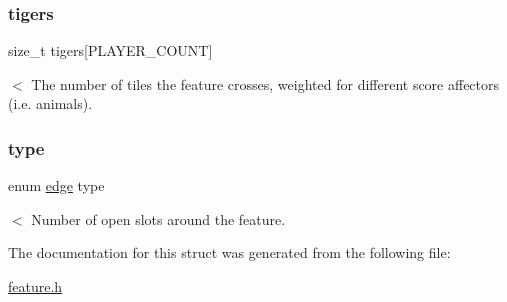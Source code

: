 \subsubsection{\texorpdfstring{tigers}{tigers}}
{\footnotesize\ttfamily size\+\_\+t tigers\mbox{[}P\+L\+A\+Y\+E\+R\+\_\+\+C\+O\+U\+NT\mbox{]}}

$<$ The number of tiles the feature crosses, weighted for different score affectors (i.\+e. animals). \hypertarget{structfeature_a4d7c1f2b809931ecd2a6c56a4ab11a3f}{}\label{structfeature_a4d7c1f2b809931ecd2a6c56a4ab11a3f} 
\subsubsection{\texorpdfstring{type}{type}}
{\footnotesize\ttfamily enum \hyperlink{edge_8h_a4ef43ff5c6d42dacbc8ffd9c8cfdc189}{edge} type}

$<$ Number of open slots around the feature. 

The documentation for this struct was generated from the following file\+:\begin{DoxyCompactItemize}
\item 
\hyperlink{feature_8h}{feature.\+h}\end{DoxyCompactItemize}
